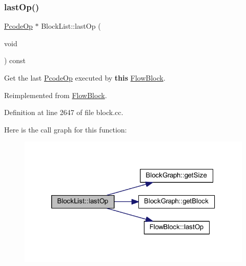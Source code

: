\mbox{\label{class_block_list_acd80d60a0cb7257e4ada35f62c6ddb91}} 
\subsubsection{\texorpdfstring{lastOp()}{lastOp()}}
{\footnotesize\ttfamily \mbox{\hyperlink{class_pcode_op}{Pcode\+Op}} $\ast$ Block\+List\+::last\+Op (\begin{DoxyParamCaption}\item[{void}]{ }\end{DoxyParamCaption}) const\hspace{0.3cm}{\ttfamily [virtual]}}



Get the last \mbox{\hyperlink{class_pcode_op}{Pcode\+Op}} executed by {\bfseries{this}} \mbox{\hyperlink{class_flow_block}{Flow\+Block}}. 



Reimplemented from \mbox{\hyperlink{class_flow_block_a5db2a7d4baa2070ebf3151b13fd16d09}{Flow\+Block}}.



Definition at line 2647 of file block.\+cc.

Here is the call graph for this function\+:
\nopagebreak
\begin{figure}[H]
\begin{center}
\leavevmode
\includegraphics[width=320pt]{class_block_list_acd80d60a0cb7257e4ada35f62c6ddb91_cgraph}
\end{center}
\end{figure}
\mbox{\label{class_block_list_a97202688e117da20c82ef225318536ca}} 
